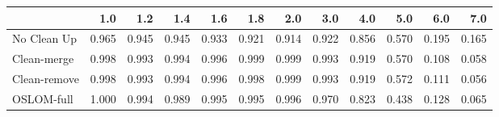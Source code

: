 \begin{tabular}{lrrrrrrrrrrr}
\toprule
{} &   1.0 &   1.2 &   1.4 &   1.6 &   1.8 &   2.0 &   3.0 &   4.0 &   5.0 &   6.0 &   7.0 \\
\midrule
No Clean Up  & 0.965 & 0.945 & 0.945 & 0.933 & 0.921 & 0.914 & 0.922 & 0.856 & 0.570 & 0.195 & 0.165 \\
Clean-merge  & 0.998 & 0.993 & 0.994 & 0.996 & 0.999 & 0.999 & 0.993 & 0.919 & 0.570 & 0.108 & 0.058 \\
Clean-remove & 0.998 & 0.993 & 0.994 & 0.996 & 0.998 & 0.999 & 0.993 & 0.919 & 0.572 & 0.111 & 0.056 \\
OSLOM-full   & 1.000 & 0.994 & 0.989 & 0.995 & 0.995 & 0.996 & 0.970 & 0.823 & 0.438 & 0.128 & 0.065 \\
\bottomrule
\end{tabular}

